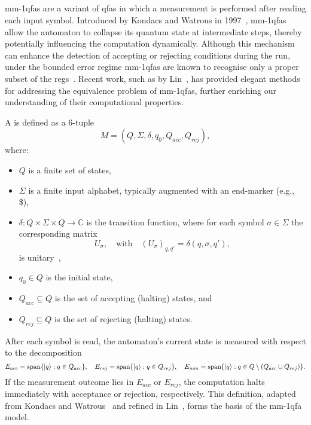 \subsection{}
\label{sec:mmqfa}
\glspl{mm-1qfa} are a variant of \glspl{qfa} in which a measurement is performed after reading each input symbol. Introduced by Kondacs and Watrous in 1997~\cite{kondacs1997power}, \glspl{mm-1qfa} allow the automaton to collapse its quantum state at intermediate steps, thereby potentially influencing the computation dynamically. Although this mechanism can enhance the detection of accepting or rejecting conditions during the run, under the bounded error regime \glspl{mm-1qfa} are known to recognise only a proper subset of the \glspl{reg}~\cite{brodsky2002characterizations}. Recent work, such as by Lin~\cite{lin2012another}, has provided elegant methods for addressing the equivalence problem of \glspl{mm-1qfa}, further enriching our understanding of their computational properties.

\begin{definition}
A  is defined as a 6-tuple
\[
M = (Q,\Sigma,\delta,q_0,Q_{acc},Q_{rej}),
\]
where:
\begin{itemize}
    \item $Q$ is a finite set of states,
    \item $\Sigma$ is a finite input alphabet, typically augmented with an end-marker (e.g., \$),
    \item $\delta : Q \times \Sigma \times Q \to \mathbb{C}$ is the transition function, where for each symbol $\sigma\in\Sigma$ the corresponding matrix 
    \[
    U_\sigma,\quad \text{with} \quad (U_\sigma)_{q,q'}=\delta(q,\sigma,q'),
    \]
    is unitary~\cite{kondacs1997power},
    \item $q_0 \in Q$ is the initial state,
    \item $Q_{acc} \subseteq Q$ is the set of accepting (halting) states, and
    \item $Q_{rej} \subseteq Q$ is the set of rejecting (halting) states.
\end{itemize}
\end{definition}

After each symbol is read, the automaton's current state is measured with respect to the decomposition
\[
E_{acc} = \text{span}\{\ket{q} : q \in Q_{acc}\},\quad
E_{rej} = \text{span}\{\ket{q} : q \in Q_{rej}\},\quad
E_{non} = \text{span}\{\ket{q} : q \in Q \setminus (Q_{acc}\cup Q_{rej})\}.
\]
If the measurement outcome lies in $E_{acc}$ or $E_{rej}$, the computation halts immediately with acceptance or rejection, respectively. This definition, adapted from Kondacs and Watrous~\cite{kondacs1997power} and refined in Lin~\cite{lin2012another}, forms the basis of the \gls{mm-1qfa} model.

